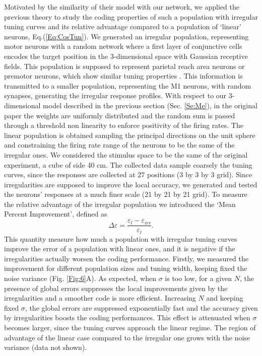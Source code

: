 \documentclass[a4paper]{article}
\begin{document}
Motivated by the similarity of their model with our network, we applied the previous theory to study the coding properties of such a population with irregular tuning curves and its relative advantage compared to a population of `linear' neurons, Eq.(\ref{Eq:CosTun}). We generated an irregular population, representing motor neurons with a random network where a first layer of conjunctive cells encodes the target position in the 3-dimensional space with Gaussian receptive fields. This population is supposed to represent parietal reach area neurons or premotor neurons, which show similar tuning properties  \cite[]{Andersen1985EncodingNeurons}. This information is transmitted to a smaller population, representing the M1 neurons, with random synapses, generating the irregular response profiles. With respect to our 3-dimensional model described in the previous section (Sec. \ref{Se:Me}), in the original paper the weights are uniformly distributed and the random sum is passed through a threshold non linearity to enforce positivity of the firing rates.   The linear population is obtained sampling the principal directions on the unit sphere and constraining the firing rate range of the neurons to be the same of the irregular ones.  We considered the stimulus space to be the same of the original experiment, a cube of side 40 cm. The collected data sample  coarsely the tuning curves, since the responses are collected at 27 positions (3 by 3 by 3 grid). Since irregularities are supposed to improve the local accuracy, we generated and tested the neurons' responses at a much finer scale (21 by 21 by 21 grid).
To measure the relative advantage of the irregular population we introduced the `Mean Percent Improvement', defined as
\begin{equation}
\Delta\varepsilon =\frac{\varepsilon_l-\varepsilon_{irr}}{\varepsilon_l}.
\end{equation}This quantity measure how much a population with irregular tuning curves improve the error of a population with linear ones, and it is negative if the irregularities actually worsen the coding performance.
Firstly,  we measured the improvement for different population sizes and tuning width, keeping fixed the noise variance  (Fig. \ref{Fig:6}A). As expected, when $\sigma$ is too low, for a given $N$, the  presence of global errors suppresses the local improvements given by the irregularities and a smoother code is more efficient. Increasing $N$ and keeping fixed $\sigma$, the global errors are suppressed exponentially fast and the accuracy given by irregularities boosts the coding performances. This effect is attenuated when $\sigma$ becomes larger, since the tuning curves approach the linear regime. The region of advantage of the linear case compared to the irregular one grows with the noise variance (data not shown).
\end{document}
